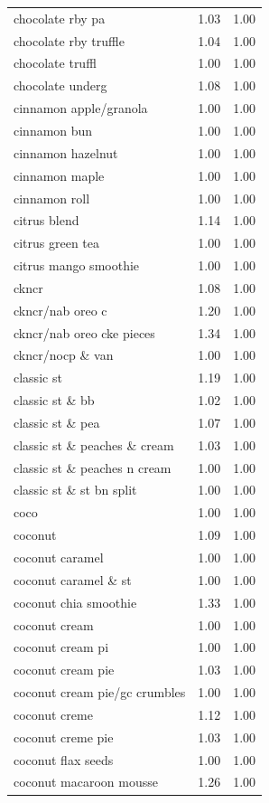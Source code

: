 \begin{table}
\begin{tabular}{lrr}
chocolate rby pa & 1.03 & 1.00 \\
chocolate rby truffle & 1.04 & 1.00 \\
chocolate truffl & 1.00 & 1.00 \\
chocolate underg & 1.08 & 1.00 \\
cinnamon apple/granola & 1.00 & 1.00 \\
cinnamon bun & 1.00 & 1.00 \\
cinnamon hazelnut & 1.00 & 1.00 \\
cinnamon maple & 1.00 & 1.00 \\
cinnamon roll & 1.00 & 1.00 \\
citrus blend & 1.14 & 1.00 \\
citrus green tea & 1.00 & 1.00 \\
citrus mango smoothie & 1.00 & 1.00 \\
ckncr & 1.08 & 1.00 \\
ckncr/nab oreo c & 1.20 & 1.00 \\
ckncr/nab oreo cke pieces & 1.34 & 1.00 \\
ckncr/nocp \& van & 1.00 & 1.00 \\
classic st & 1.19 & 1.00 \\
classic st \& bb & 1.02 & 1.00 \\
classic st \& pea & 1.07 & 1.00 \\
classic st \& peaches \& cream & 1.03 & 1.00 \\
classic st \& peaches n cream & 1.00 & 1.00 \\
classic st \& st bn split & 1.00 & 1.00 \\
coco & 1.00 & 1.00 \\
coconut & 1.09 & 1.00 \\
coconut caramel & 1.00 & 1.00 \\
coconut caramel \& st & 1.00 & 1.00 \\
coconut chia smoothie & 1.33 & 1.00 \\
coconut cream & 1.00 & 1.00 \\
coconut cream pi & 1.00 & 1.00 \\
coconut cream pie & 1.03 & 1.00 \\
coconut cream pie/gc crumbles & 1.00 & 1.00 \\
coconut creme & 1.12 & 1.00 \\
coconut creme pie & 1.03 & 1.00 \\
coconut flax seeds & 1.00 & 1.00 \\
coconut macaroon mousse & 1.26 & 1.00 \\

\end{tabular}
\end{table}
